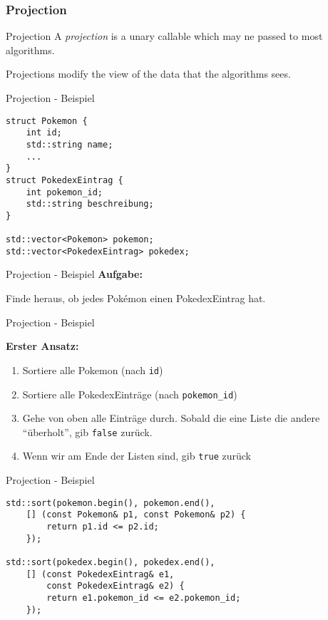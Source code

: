 \subsubsection{Projection}

\begin{frame}{Projection}
    A \emph{projection} is a unary callable which may ne passed to most algorithms.

    \vspace{2.5em}

    Projections modify the view of the data that the algorithms sees.
\end{frame}

\begin{frame}[fragile]{Projection - Beispiel}
    \begin{verbatim}
struct Pokemon {
    int id;
    std::string name;
    ...
}
struct PokedexEintrag {
    int pokemon_id;
    std::string beschreibung;
}

std::vector<Pokemon> pokemon;
std::vector<PokedexEintrag> pokedex;
    \end{verbatim}
\end{frame}

\begin{frame}{Projection - Beispiel}
    \textbf{Aufgabe:}

    Finde heraus, ob jedes Pokémon einen PokedexEintrag hat.
\end{frame}

\begin{frame}{Projection - Beispiel}
    \begin{center}
        \textbf{Erster Ansatz:}
    \end{center}
    \begin{enumerate}
        \item<1-> Sortiere alle Pokemon (nach \texttt{id})
        \item<2-> Sortiere alle PokedexEinträge (nach \texttt{pokemon\_id})
        \item<3-> Gehe von oben alle Einträge durch.
            Sobald die eine Liste die andere \enquote{überholt}, gib \texttt{false} zurück.
        \item<4-> Wenn wir am Ende der Listen sind, gib \texttt{true} zurück
    \end{enumerate}
\end{frame}

\begin{frame}[fragile]{Projection - Beispiel}
    \begin{verbatim}
std::sort(pokemon.begin(), pokemon.end(),
    [] (const Pokemon& p1, const Pokemon& p2) {
        return p1.id <= p2.id;
    });

std::sort(pokedex.begin(), pokedex.end(),
    [] (const PokedexEintrag& e1,
        const PokedexEintrag& e2) {
        return e1.pokemon_id <= e2.pokemon_id;
    });
    \end{verbatim}
\end{frame}

